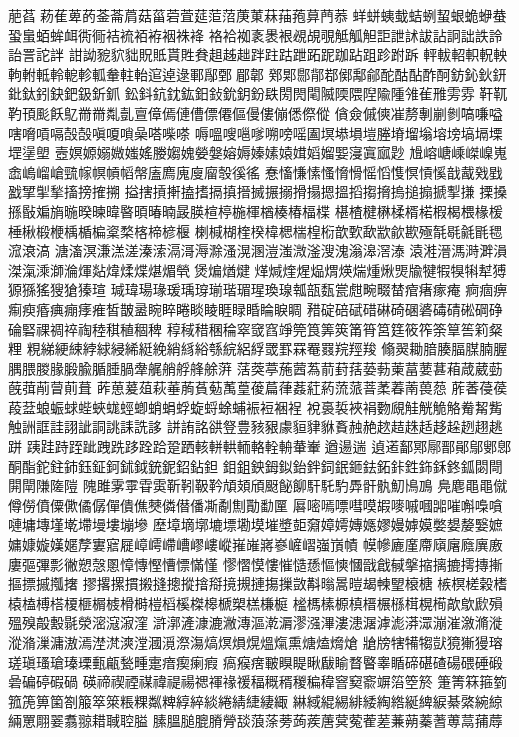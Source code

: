 萉萏菞萑萆菂菳菕菺菇菑菪萓莚菃菬菮菄菻菗菢萛菛菾
蛘蛢蛦蛓蛣蛚蛪蛝蛫蛜蛬蛩蛗蛨蛑衈衖衕袺裗袹袸裀袾袶
袼袷袽袲褁裉覕覘覗觝觚觛詎詍訹詙詀詗詘詄詅詒詈詑詊
詌詏豟貁貀貺貾貰貹貵趄趀趉跘跓跍跇跖跜跏跕跙跈跗跅
軯軷軺軹軦軮軥軵軧軨軶軫軱軬軴軩逭逴逯鄆鄬鄄郿郼
鄈郹郻鄁鄀鄇鄅鄃酡酤酟酢酠鈁鈊鈥鈃鈚鈦鈏鈌鈀鈒釿釽
鈆鈄鈧鈂鈜鈤鈙鈗鈅鈖镻閍閌閐隇陾隈隉隃隀雂雈雃雱雰
靬靰靮頇颩飫鳦⿋黹亃亄亶傽傿僆傮僄僊傴僈僂傰僁傺傱
僋僉傶傸凗剺剸剻剼嗃嗛嗌嗐嗋嗊嗝嗀嗀嗔嗄嗩喿嗒喍嗏
嗕嗢嗖嗈嗲嗍嗙嗂圔塓塨塤塏塍塉塯塕塎塝塙塥塛堽塣塱
壼嫇嫄嫋媺媸媱媵媰媿嫈媻嫆媷嫀嫊媴媶嫍媹媐寖寘寙尟
尳嵱嵣嵊嵥嵲嵬嵞嵨嵧嵢巰幏幎幊幍幋廅廌廆廋廇彀徯徭
惷慉慊愫慅愶愲愮慆愯慏愩慀戠酨戣戥戤揅揱揫搐搒搉搠
搤搳摃搟搕搘搹搷搢搣搌搦搰搨摁搵搯搊搚摀搥搧搋揧搛
搮搡搎敯斒旓暆暌暕暐暋暊暙暔晸朠楦楟椸楎楢楱椿楅楪
椹楂楗楙楺楈楉椵楬椳椽楥棰楸椴楩楀楯楄楶楘楁楴楌椻
楋椷楜楏楑椲楒椯楻椼歆歅歃歂歈歁殛毻毼毹毷毸溛滖滈
溏滀溟溓溔溠溱溹滆滒溽滁溞滉溷溰滍溦滏溲溾滃滜滘溙
溒溎溍溤溡溿溳滐滊溗溮溣煇煔煒煣煠煁煝煢煲煸煪煡
煂煘煃煋煰煟煐煓煄煍煚牏犍犌犑犐犎猼獂猻猺獀獊獉瑄
瑊瑋瑒瑑瑗瑀瑏瑐瑎瑂瑆瑍瑔瓡瓿瓾瓽甝畹畷榃痯瘏瘃痷
痾痼痹痸瘐痻痶痭痵痽皙皵盝睕睟睠睒睖睚睩睧睔睙睭
矠碇碚碔碏碄碕碅碆碡碃硹碙碀碖硻祼禂祽祹稑稘稙稒稗
稕稢稓稛稐窣窢窞竫筦筤筭筴筩筲筥筳筱筰筡筸筶筣粲粴
粯綈綆綀綍絿綅絺綎絻綃絼綌綔綄絽綒罭罫罧罨罬羦羥羧
翛翜耡腤腠腷腜腩腛腢腲朡腞腶腧腯腄腡舝艉艄艀艂艅蓱
萿葖葶葹蒏蒍葥葑葀蒆葧萰葍葽葚葙葴葳葝蔇葞萷萺萴葺
葃葸萲葅萩菙葋萯葂萭葟葰萹葎葌葒葯蓅蒎萻葇萶萳葨葾
葄萫葠葔葮葐蜋蜄蛷蜌蛺蛖蛵蝍蛸蜎蜉蜁蛶蜍蜅裖裋裍裎
裞裛裚裌裐覅覛觟觥觤觡觠觢觜触詶誆詿詡訿詷誂誄詵誃
誁詴詺谼豋豊豥豤豦貆貄貅賌赨赩趑趌趎趏趍趓趔趐趒跰
跠跬跱跮跐跩跣跢跧跲跫跴輆軿輁輀輅輇輈輂輋遒逿遄
遉逽鄐鄍鄏鄑鄖鄔鄋鄎酮酯鉈鉒鈰鈺鉦鈳鉥鉞銃鈮鉊鉆鉭
鉬鉏鉠鉧鉯鈶鉡鉰鈱鉔鉣鉐鉲鉎鉓鉌鉖鈲閟閜閞閛隒隓隑
隗雎雺雽雸雵靳靷靸靲頏頍頎颬飶飹馯馲馰馵骭骫魛鳪鳭
鳧麀⿌黽僦僔僗僨僳僛僪僝僤僓僬僰僯僣僠凘劀劁勩勫匰
厬嘧嘕嘌嘒嗼嘏嘜嘁嘓嘂嗺嘝嘄嗿嗹墉塼墐墘墆墁塿塴墋
塺墇墑墎塶墂墈塻墔墏壾奫嫜嫮嫥嫕嫪嫚嫭嫫嫳嫢嫠嫛嫬
嫞嫝嫙嫨嫟孷寠寣屣嶂嶀嵽嶆嵺嶁嵷嶊嶉嶈嵾嵼嶍嵹嵿幘
幙幓廘廑廗廎廜廕廙廒廔彄彃彯徶愬愨慁慞慱慳慒慓慲慬
憀慴慔慺慛慥愻慪慡慖戩戧戫搫摍摛摝摴摶摲摳摽摵摦撦
摎撂摞摜摋摓摠摐摿搿摬摫摙摥摷敳斠暡暠暟朅朄朢榱榶
槉榠槎榖榰榬榼榑榙榎榧榍榩榾榯榿槄榽榤槔榹槊榚槏榳
榓榪榡榞槙榗榐槂榵榥槆歊歍歋殞殟殠毃毄毾滎滵滱漃漥
滸漷滻漮漉潎漙漚漧漘漻漒滭漊漶潳滹滮漭潀漰漼漵滫漇
漎潃漅滽滶漹漜滼漺漟漍漞漈漡熇熐熉熀熅熂熏煻熆熁熗
牄牓犗犕犓獃獍獑獌瑢瑳瑱瑵瑲瑧瑮甀甂甃畽疐瘖瘈瘌瘕
瘑瘊瘔皸瞁睼瞅瞂睮瞀睯睾瞃碲碪碴碭碨硾碫碞碥碠碬碢
碤禘禊禋禖禕禔禓禗禈禒禐稫穊稰稯稨稦窨窫窬竮箈箜箊
箑箐箖箍箌箛箎箅箘劄箙箤箂粻粿粼粺綧綷緂綣綪緁緀緅
綝緎緄緆緋緌綯綹綖綼綟綦綮綩綡緉罳翢翣翥翞耤聝聜膉
膆膃膇膍膌膋舕蒗蒤蒡蒟蒺蓎蓂蒬蒮蒫蒹蒴蓁蓍蒪蒚蒱蓐

